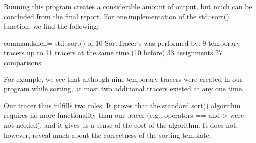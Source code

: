 Running this program creates a considerable amount of output, but much can be concluded from the final report. For one implementation of the std::sort() function, we find the following:

\begin{tcblisting}{commandshell={}}
std::sort() of 10 SortTracer’s was performed by:
 9 temporary tracers
 up to 11 tracers at the same time (10 before)
 33 assignments
 27 comparisons
\end{tcblisting}

For example, we see that although nine temporary tracers were created in our program while sorting, at most two additional tracers existed at any one time.

Our tracer thus fulfills two roles: It proves that the standard sort() algorithm requires no more functionality than our tracer (e.g., operators == and > were not needed), and it gives us a sense of the cost of the algorithm. It does not, however, reveal much about the correctness of the sorting template.




































